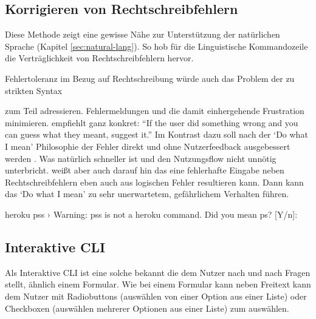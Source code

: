 \documentclass[oneside,bibliography=totocnumbered,BCOR=5mm]{scrbook}
\newenvironment{code}{\captionsetup{type=listing, skip=0pt}}{}
\begin{document}

\subsection{Korrigieren von Rechtschreibfehlern}

Diese Methode zeigt eine gewisse Nähe zur Unterstützung der natürlichen
Sprache (Kapitel \ref{sec:natural-lang}). So hob \cite{Raskin_2008} für die
Linguistische Kommandozeile die Verträglichkeit von Rechtschreibfehlern hervor.

Fehlertoleranz im Bezug auf Rechtschreibung würde auch das Problem der zu strikten Syntax %

zum Teil adressieren. Fehlermeldungen und die damit einhergehende Frustration minimieren.
\cite{clig} empfiehlt ganz konkret: ``If the user did something wrong and you can
guess what they meant, suggest it.'' Im Kontrast dazu soll nach der `Do what I
mean' Philosophie der Fehler direkt und ohne Nutzerfeedback ausgebessert werden
\parencite{DWIM}. Was natürlich schneller ist und den Nutzungsflow nicht unnötig
unterbricht. \cite{clig} weißt aber auch darauf hin das eine fehlerhafte Eingabe
neben Rechtschreibfehlern eben auch aus logischen Fehler resultieren kann. Dann
kann das `Do what I mean' zu sehr unerwartetem, gefährlichem Verhalten führen.

\begin{code}
  \begin{shellcode}
heroku pss
 ›   Warning: pss is not a heroku command.
Did you mean ps? [Y/n]:
  \end{shellcode}
  \medskip
\end{code}


\subsection{Interaktive CLI}

Als Interaktive CLI ist eine solche bekannt die dem Nutzer nach und nach Fragen
stellt, ähnlich einem Formular. Wie bei einem Formular kann neben Freitext kann
dem Nutzer mit Radiobuttons (auswählen von einer Option aus einer Liste) oder
Checkboxen (auswählen mehrerer Optionen aus einer Liste) zum auswählen. %
\end{document}
